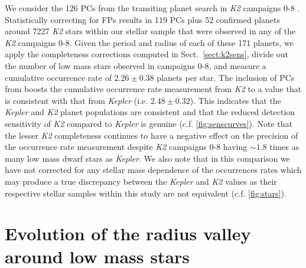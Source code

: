 \documentclass[twocolumn]{emulateapj}
\newcommand{\kepler}[1]{\emph{Kepler}#1}
\newcommand{\ktwo}[1]{\emph{K2}#1}
\begin{document}
We consider the 126 PCs from the transiting planet search in \ktwo{} campaigns 0-8 \citep{kruse19}.
Statistically correcting
for FPs results in 119 PCs plus 52 confirmed planets around 7227 \ktwo{} stars within our stellar sample that
were observed in any of the \ktwo{} campaigns 0-8. Given the period and radius of each of these 171 planets,
we apply the completeness corrections computed in Sect.~\ref{sect:k2sens}, divide out the number of low mass stars
observed in campaigns 0-8, and measure a cumulative occurrence rate of $2.26\pm 0.38$ planets per star. The inclusion
of PCs from \cite{kruse19} boosts the cumulative occurrence rate measurement from \ktwo{} to a value that is
consistent with that from \kepler{} (i.e. $2.48\pm 0.32$). This indicates that the \kepler{} and
\ktwo{} planet populations are consistent and that the reduced detection sensitivity of \ktwo{} compared to
\kepler{} is genuine (c.f. \autoref{fig:senscurves}). Note that the lesser \ktwo{} completeness continues to
have a negative
effect on the precision of the occurrence rate measurement despite \ktwo{} campaigns 0-8 having $\sim 1.8$ times
as many low mass dwarf stars as \kepler{.} We also note that in this comparison we have not corrected for any stellar
mass dependence of the occurrences rates which may produce a true discrepancy between the \kepler{} and \ktwo{}
values as their respective stellar samples within this study are not equivalent (c.f. \autoref{fig:stars}).  

\section{Evolution of the radius valley around low mass stars} \label{sect:models}
\end{document}
